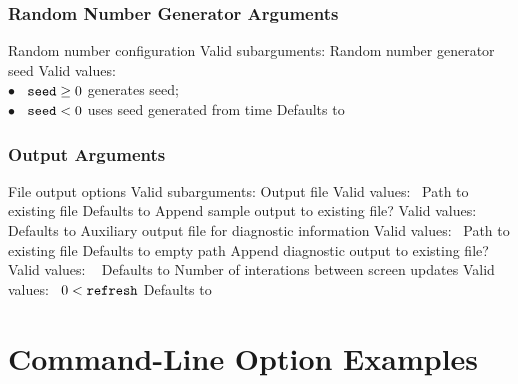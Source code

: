 \subsubsection{Random Number Generator Arguments}

\begin{description}

  {Random number configuration}
  {Valid subarguments: }
%
    {Random number generator seed}
    {Valid values: \\
      \hspace*{8pt} $\bullet$ \ $\mbox{{\tt seed}} \geq 0$ generates seed; 
      \\
      \hspace*{8pt} $\bullet$ \ $\mbox{{\tt seed}} < 0$ uses seed generated from time}
    {Defaults to }
%
\end{description}

\subsubsection{Output Arguments}

\begin{description}
  {File output options}
  {Valid subarguments: }
%
    {Output file}
    {Valid values: \  Path to existing file}
    {Defaults to }
%
    {Append sample output to existing file?}
    {Valid values: \ }
    {Defaults to }
%
    {Auxiliary output file for diagnostic information}
    {Valid values: \  Path to existing file}
    {Defaults to empty path}
%
    {Append diagnostic output to existing file?}
    {Valid values: \ }
    {Defaults to }
%
    {Number of interations between screen updates}
    {Valid values: \  $0 < \mbox{{\tt refresh}}$}
    {Defaults to }
%
\end{description}

\section{Command-Line Option Examples}

